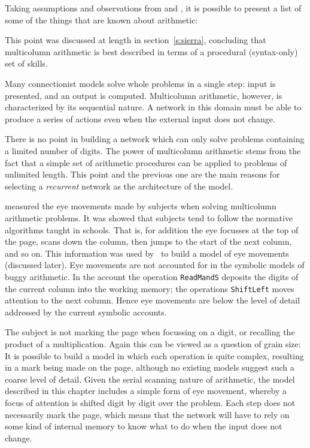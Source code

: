 Taking assumptions and observations from
 and , it is possible to present a list of
some of the things that are known about arithmetic:

 This point was discussed at length
in section~\ref{s:sierra}, concluding that multicolumn arithmetic is best
described in terms of a procedural (syntax-only) set of skills.

 Many connectionist models solve whole problems in
a single step: input is presented, and an output is computed.  Multicolumn
arithmetic, however, is characterized by its sequential nature.  A network
in this domain must be able to produce a series of actions even when the
external input does not change.

 There is no point in building a network
which can only solve problems containing a limited number of digits.  The
power of multicolumn arithmetic stems from the fact that a simple set of
arithmetic procedures can be applied to problems of unlimited length.  This
point and the previous one are the main reasons for selecting a {\em
recurrent\/} network as the architecture of the model.

  measured the eye
movements made by subjects when solving multicolumn arithmetic
problems.  It was showed that subjects tend to follow the
normative algorithms taught in schools. That is, for addition the eye
focusses
at the top of the page, scans down the column, then jumps to the start of
the next column, and so on. This information was used by
\citeauthor{suppproc}\ to build a model of eye movements (discussed later).
Eye movements are not accounted for in the symbolic models of buggy
arithmetic.  In the \citeauthor{younerro} account the operation
\verb|ReadMandS| deposits the digits of the current column into the working
memory; the operations \verb|ShiftLeft| moves attention to the next column.
Hence eye movements are below the level of detail addressed by the current
symbolic accounts.

 The subject is not marking the
page when focussing on a digit, or recalling the product of a
multiplication. Again this can be viewed as a question of grain size: It is
possible to build a model in which each operation is quite complex,
resulting in a mark being made on the page, although no existing models
suggest such a coarse level of detail.  Given the serial scanning nature of
arithmetic, the model described in this chapter includes a simple form
of eye
movement, whereby a focus of attention is shifted digit by digit over the
problem.  Each step does not necessarily mark the page, which means that
the network will have to rely on some kind of internal memory to know what
to do when the input does not change.

